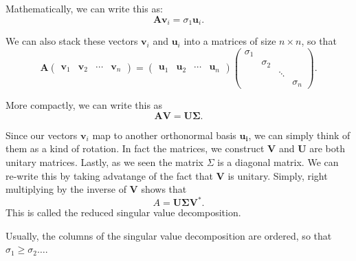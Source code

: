 \documentclass[12pt]{article}
\renewcommand{\vec}[1]{\mathbf{#1}}
\theoremstyle{definition}
\theoremstyle{remark}
\numberwithin{equation}{section}
\begin{document}

Mathematically, we can write this as:
\begin{equation}
\vec{Av}_i = \sigma_1 \vec{u}_i.
\end{equation}

We can also stack these vectors $\vec{v}_i$ and $\vec{u}_i$ into a matrices of size $n \times n$, so that
\begin{equation}
  \vec{A} \begin{pmatrix}
    \vec{v}_1 & \vec{v}_2 & \cdots & \vec{v}_n
  \end{pmatrix} = \begin{pmatrix}
    \vec{u}_1 & \vec{u}_2 & \cdots & \vec{u}_n
    \end{pmatrix} \begin{pmatrix}
    \sigma_1 & & &  \\
             & \sigma_2 & & \\
             & & \ddots &  \\
             & & & \sigma_n
  \end{pmatrix}.
\end{equation}

More compactly, we can write this as 
\begin{equation}
  \vec{AV} = \vec{U\Sigma}.
\end{equation}

Since our vectors $\vec{v}_i$ map to another orthonormal basis $\vec{u_i}$, we can simply think of them as a kind of rotation. In fact the matrices, we construct $\vec{V}$ and $\vec{U}$ are both unitary matrices. Lastly, as we seen the matrix $\Sigma$ is a diagonal matrix. We can re-write this by taking advatange of the fact that $\vec{V}$ is unitary. Simply, right multiplying by the inverse of $\vec{V}$ shows that 
\begin{equation}
  A = \vec{U} \vec{\Sigma} \vec{V}^*.
\end{equation}
This is called the reduced singular value decomposition. 

Usually, the columns of the singular value decomposition are ordered, so that $\sigma_1 \geq \sigma_2 \ldots$.
\end{document}
